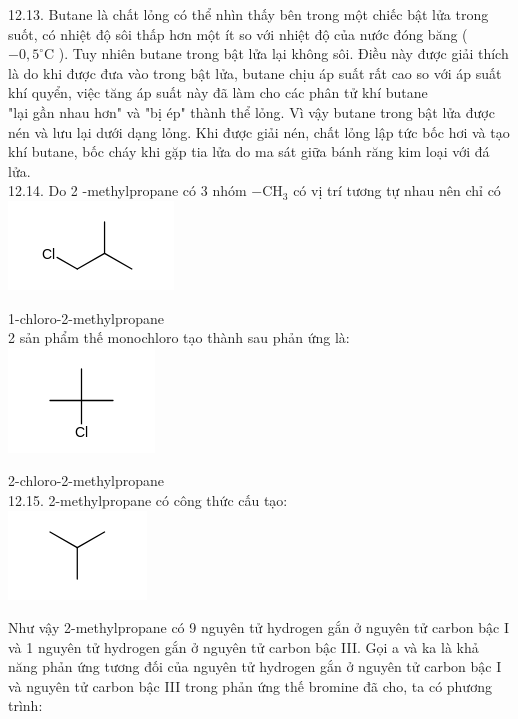 \documentclass[10pt]{article}
\begin{document}
12.13. Butane là chất lỏng có thể nhìn thấy bên trong một chiếc bật lửa trong suốt, có nhiệt độ sôi thấp hơn một ít so với nhiệt độ của nước đóng băng ( $-0,5^{\circ} \mathrm{C}$ ). Tuy nhiên butane trong bật lửa lại không sôi. Điều này được giải thích là do khi được đưa vào trong bật lửa, butane chịu áp suất rất cao so với áp suất khí quyển, việc tăng áp suất này đã làm cho các phân tử khí butane\\
"lại gần nhau hơn" và "bị ép" thành thể lỏng. Vì vậy butane trong bật lửa được nén và lưu lại dưới dạng lỏng. Khi được giải nén, chất lỏng lập tức bốc hơi và tạo khí butane, bốc cháy khi gặp tia lửa do ma sát giữa bánh răng kim loại với đá lửa.\\
12.14. Do 2 -methylpropane có 3 nhóm $-\mathrm{CH}_{3}$ có vị trí tương tự nhau nên chỉ có\\
\includegraphics{smile-6bd4d6fca35d0608bc28b02ad31cb1fc467e6eb3}

1-chloro-2-methylpropane\\
2 sản phẩm thế monochloro tạo thành sau phản ứng là:\\
\includegraphics{smile-755a8cffea9f04219d628804b192030067108245}

2-chloro-2-methylpropane\\
12.15. 2-methylpropane có công thức cấu tạo:\\
\includegraphics{smile-5ed9796ff9dd905ff370aa0b6fb1b93fb339d590}

Như vậy 2-methylpropane có 9 nguyên tử hydrogen gắn ở nguyên tử carbon bậc I và 1 nguyên tử hydrogen gắn ở nguyên tử carbon bậc III. Gọi a và ka là khả năng phản ứng tương đối của nguyên tử hydrogen gắn ở nguyên tử carbon bậc I và nguyên tử carbon bậc III trong phản ứng thế bromine đã cho, ta có phương trình:
\end{document}
